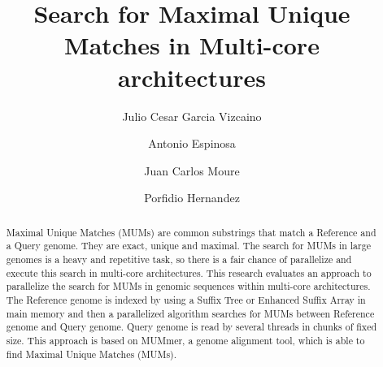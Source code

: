 \documentclass[runningheads,a4paper]{llncs}
\begin{document}
\mainmatter

\title{Search for Maximal Unique Matches in Multi-core architectures}
\author{Julio Cesar Garcia Vizcaino \and Antonio Espinosa \and Juan Carlos Moure \and Porfidio Hernandez }
 

\maketitle
\begin{center}
  \mailsa

  \mailsb
\end{center}

\begin{abstract}
  Maximal Unique Matches (MUMs) are common substrings that match a Reference and a Query genome. They are exact, unique and maximal. The search for MUMs in large genomes is a heavy and repetitive task, so there is a fair chance of parallelize and execute this search in multi-core architectures. This research evaluates an approach to parallelize the search for MUMs in genomic sequences within multi-core architectures. The Reference genome is indexed by using a Suffix Tree or Enhanced Suffix Array in main memory and then a parallelized algorithm searches for MUMs between Reference genome and Query genome. Query genome is read by several threads in chunks of fixed size. This approach is based on MUMmer, a genome alignment tool, which is able to find Maximal Unique Matches (MUMs). 

\end{abstract}
\end{document}
